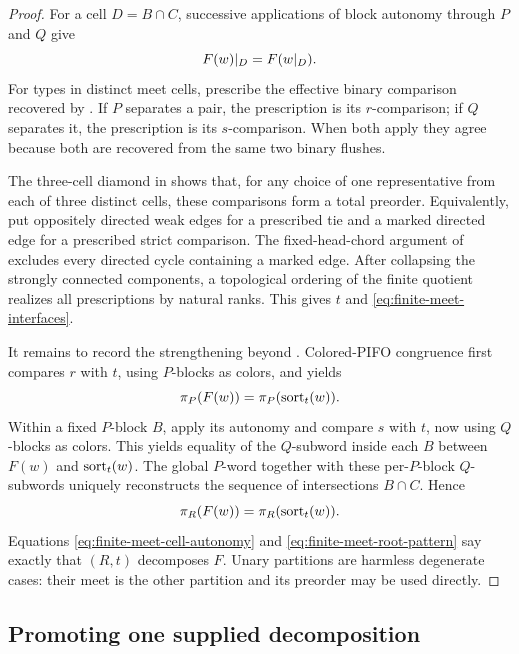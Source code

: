 \begin{proof}
For a cell \(D=B\cap C\), successive applications of block autonomy through
\(P\) and \(Q\) give
\begin{equation}
 F(w)\mathord{|}_{D}=F(w\mathord{|}_{D}).
 \label{eq:finite-meet-cell-autonomy}
\end{equation}
For types in distinct meet cells, prescribe the effective binary comparison
recovered by .  If \(P\) separates a pair, the
prescription is its \(r\)-comparison; if \(Q\) separates it, the prescription
is its \(s\)-comparison.  When both apply they agree because both are recovered
from the same two binary flushes.

The three-cell diamond in  shows that, for any choice of
one representative from each of three distinct cells, these comparisons form
a total preorder.  Equivalently, put
oppositely directed weak edges for a prescribed tie and a marked directed
edge for a prescribed strict comparison.  The fixed-head-chord argument of
 excludes every directed cycle containing a marked
edge.  After collapsing the strongly connected components, a
topological ordering of the finite quotient realizes all prescriptions by
natural ranks.  This gives \(t\) and
\autoref{eq:finite-meet-interfaces}.

It remains to record the strengthening beyond
.  Colored-PIFO congruence first compares \(r\) with
\(t\), using \(P\)-blocks as colors, and yields
\[
 \pi_{P}(F(w))=\pi_{P}(\operatorname{sort}_t(w)).
\]
Within a fixed \(P\)-block \(B\), apply its autonomy and compare \(s\) with
\(t\), now using \(Q\)-blocks as colors.  This yields equality of the
\(Q\)-subword inside each \(B\) between \(F(w)\) and \(\operatorname{sort}_t(w)\).  The
global \(P\)-word together with these per-\(P\)-block \(Q\)-subwords uniquely
reconstructs the sequence of intersections \(B\cap C\).  Hence
\begin{equation}
 \pi_{R}(F(w))=\pi_{R}(\operatorname{sort}_t(w)).
 \label{eq:finite-meet-root-pattern}
\end{equation}
Equations \eqref{eq:finite-meet-cell-autonomy} and
\eqref{eq:finite-meet-root-pattern} say exactly that \((R,t)\) decomposes
\(F\).  Unary partitions are harmless degenerate cases: their meet is the
other partition and its preorder may be used directly.
\end{proof}

\subsection{Promoting one supplied decomposition}


